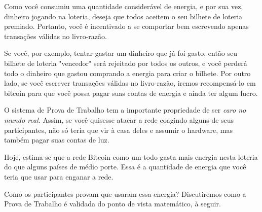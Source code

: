 Como você consumiu uma quantidade considerável de energia, e por sua vez, dinheiro jogando na loteria, deseja que todos aceitem o seu bilhete de loteria premiado. Portanto, você é incentivado a se comportar bem escrevendo apenas transações válidas no livro-razão.

Se você, por exemplo, tentar gastar um dinheiro que já foi gasto, então seu bilhete de loteria "vencedor" será rejeitado por todos os outros, e você perderá todo o dinheiro que gastou comprando a energia para criar o bilhete. Por outro lado, se você escrever transações válidas no livro-razão, iremos recompensá-lo em bitcoin para que você possa pagar suas contas de energia e ainda ter algum lucro.

O sistema de Prova de Trabalho tem a importante propriedade de ser \textit{caro no mundo real}. Assim, se você quisesse atacar a rede coagindo alguns de seus participantes, não só teria que vir à casa deles e assumir o hardware, mas também pagar suas contas de luz.

Hoje, estima-se que a rede Bitcoin como um todo gasta mais energia nesta loteria do que alguns países de médio porte. Essa é a quantidade de energia que você teria que usar para enganar a rede.

Como os participantes provam que usaram essa energia? Discutiremos como a Prova de Trabalho é validada do ponto de vista matemático, à seguir.